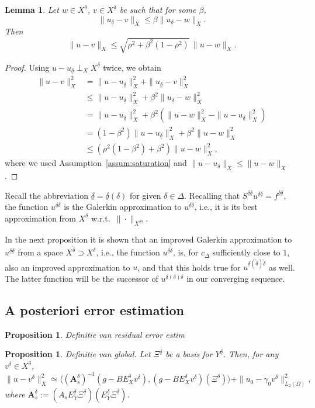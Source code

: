\documentclass[11pt,a4paper,oneside,english]{amsart}
\numberwithin{equation}{section}
\numberwithin{theorem}{section}
\newtheorem{lemma}[theorem]{Lemma}
\newtheorem{prop}[theorem]{Proposition}
\theoremstyle{definition}
\newcommand{\la}{\langle}
\newcommand{\ra}{\rangle}
\newcommand{\udelta}{{\underline{\delta}}}
\newcommand{\jw}[1]{{\color{red}{JW: #1}}}
\begin{document}
\begin{lemma}
  Let $w \in X^\delta$, $v \in X^\udelta$ be such that for some $\beta$,
  \[
    \|u_\udelta-v\|_X \leq \beta \|u_\udelta-w\|_X.
  \]
  Then
  \[
    \|u-v\|_X \leq \sqrt{\rho^2+\beta^2(1-\rho^2)}\,\|u-w\|_X.
  \]
\end{lemma}
\begin{proof}
  Using $u-u_\udelta \perp_X X^\udelta$ twice, we obtain
  \begin{align*}
    \|u-v\|_X^2& =\|u-u_\udelta\|_X^2+\|u_\udelta-v\|_X^2\\
    &\leq \|u-u_\udelta\|_X^2+\beta^2 \|u_\udelta-w\|_X^2\\
    &=\|u-u_\udelta\|_X^2+\beta^2 (\|u-w\|_X^2-\|u-u_\udelta\|_X^2)\\
    &=(1-\beta^2)\|u-u_\udelta\|_X^2+\beta^2\|u-w\|_X^2\\
    &\leq (\rho^2(1-\beta^2)+\beta^2)\|u-w\|_X^2,
  \end{align*}
  where we used Assumption~\ref{assum:saturation} and $\|u-u_\delta\|_X \leq \|u-w\|_X$.
\end{proof}

Recall the abbreviation $\udelta=\udelta(\delta)$ for given $\delta \in \Delta$.
Recalling that $S^{\udelta \udelta} u^{\udelta \udelta}=f^{\udelta \udelta}$,
the function $u^{\udelta \delta}$ is the Galerkin approximation to
$u^{\udelta \udelta}$, i.e., it is its best approximation from $X^\delta$
w.r.t.~$\|\cdot\|_{X^{\udelta \udelta}}$.

In the next proposition it is shown that an improved Galerkin approximation to
$u^{\udelta \udelta}$ from a space $X^{\tilde{\delta}} \supset X^\delta$, i.e.,
the function $u^{\udelta \tilde{\delta}}$, is, for $c_\Delta$ sufficiently close
to $1$, also an improved approximation to $u$, and that this holds true for
$u^{\udelta(\tilde{\delta}) \tilde{\delta}}$ as well. The latter function will be
the successor of $u^{\udelta(\delta) \delta}$ in our converging sequence.

\jw{todo finish}

\subsection{A posteriori error estimation}
\begin{prop}
  \label{prop:residual-apost}
  Definitie van residual error estim
\end{prop}

\begin{prop}
  \label{prop:global-apost}
  Definitie van global. Let $\Xi^{\udelta}$ be a basis for $Y^{\udelta}$. Then,
  for any $v^\delta \in X^\delta$,
  \[
    \|u - v^\delta\|_X^2 \simeq \la (\mathbf A_s^{\udelta})^{-1}(g - B E_X^{\delta} v^\delta), (g - B E_X^{\delta} v^\delta)(\Xi^{\udelta}) \ra + \|u_0 - \gamma_0 v^\delta\|_{L_2(\Omega)}^2,
  \]
  where $\mathbf A_s^{\udelta} := (A_s E_Y^{\udelta} \Xi^{\udelta})(E_Y^{\udelta} \Xi^{\udelta})$.
\end{prop}
\end{document}
